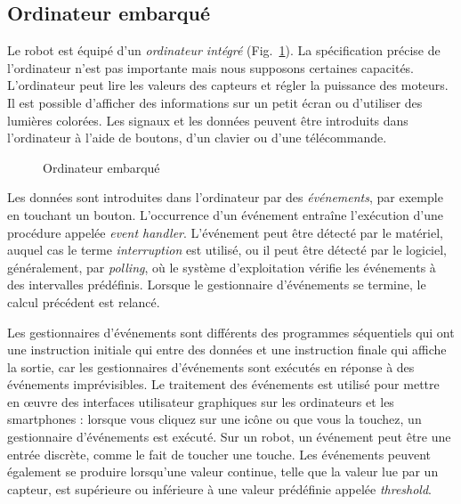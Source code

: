 {\subsection{Ordinateur embarqué}\label{s.embedded}

Le robot est équipé d'un \emph{ordinateur intégré} (Fig.~\ref{fig.computer}). La spécification précise de l'ordinateur n'est pas importante mais nous supposons certaines capacités. L'ordinateur peut lire les valeurs des capteurs et régler la puissance des moteurs. Il est possible d'afficher des informations sur un petit écran ou d'utiliser des lumières colorées. Les signaux et les données peuvent être introduits dans l'ordinateur à l'aide de boutons, d'un clavier ou d'une télécommande.

\begin{figure}
\begin{center}
\caption{Ordinateur embarqué}\label{fig.computer}
\end{center}
\end{figure}

Les données sont introduites dans l'ordinateur par des \emph{événements}, par exemple en touchant un bouton. L'occurrence d'un événement entraîne l'exécution d'une procédure appelée \emph{event handler}. L'événement peut être détecté par le matériel, auquel cas le terme \emph{interruption} est utilisé, ou il peut être détecté par le logiciel, généralement, par \emph{polling}, où le système d'exploitation vérifie les événements à des intervalles prédéfinis. Lorsque le gestionnaire d'événements se termine, le calcul précédent est relancé.

Les gestionnaires d'événements sont différents des programmes séquentiels qui ont une instruction initiale qui entre des données et une instruction finale qui affiche la sortie, car les gestionnaires d'événements sont exécutés en réponse à des événements imprévisibles. Le traitement des événements est utilisé pour mettre en œuvre des interfaces utilisateur graphiques sur les ordinateurs et les smartphones : lorsque vous cliquez sur une icône ou que vous la touchez, un gestionnaire d'événements est exécuté. Sur un robot, un événement peut être une entrée discrète, comme le fait de toucher une touche. Les événements peuvent également se produire lorsqu'une valeur continue, telle que la valeur lue par un capteur, est supérieure ou inférieure à une valeur prédéfinie appelée \emph{threshold}.

}
